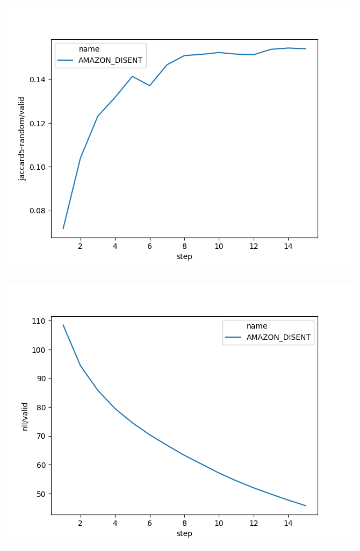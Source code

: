 \begin{figure}[h]
	\centering
	\begin{subfigure}{0.3\textheight}
		\centering
		\includegraphics[width=1.\textwidth]{images/figs2/2020_01_15__11_42_11__jaccard5-random.png}
		\caption{}
		\label{fig:chap4:amazon_disent_jaccard}
	\end{subfigure}
	\begin{subfigure}{0.3\textheight}
		\centering
		\includegraphics[width=1.\textwidth]{images/figs2/2020_01_15__11_42_11__nll.png}
		\caption{}
		\label{fig:chap4:amazon_disent_nll}
	\end{subfigure}
	\begin{subfigure}{0.3\textheight}
		\centering

\end{subfigure}
\end{figure}
